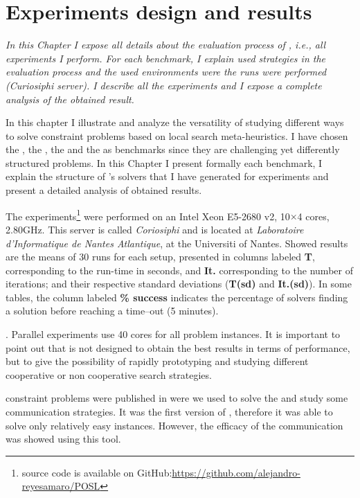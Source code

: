 \chapter{Experiments design and results}
\label{chap:expe}
\textit{In this Chapter I expose all details about the evaluation process of \posl{}, i.e., all experiments I perform. For each benchmark, I explain used strategies in the evaluation process and the used environments were the runs were performed (\textit{Curiosiphi} server). %
I describe all the experiments and I expose a complete analysis of the obtained result.}
\vfill
\minitoc
\newpage

In this chapter I illustrate and analyze the versatility of \posl{} studying different ways to solve constraint problems based on local search meta-heuristics. 
I have chosen the \sgp, the \nqp, the \carrp{} and the \grp{} as benchmarks since they are challenging yet differently structured problems. In this Chapter I present formally each benchmark, I explain the structure of \posl's solvers that I have generated for experiments and present a detailed analysis of obtained results.

The experiments\footnote{\posl{} source code is available on GitHub:\href{https://github.com/alejandro-reyesamaro/POSL}{https://github.com/alejandro-reyesamaro/POSL}} 
were performed on an Intel\R{} Xeon\TM{} E5-2680 v2, 10$\times$4 cores, 2.80GHz. This server is called \textit{Coriosiphi} and is located at \textit{Laboratoire d'Informatique de Nantes Atlantique}, at the Universiti of Nantes. Showed results are the means of 30 runs for each setup, presented in columns labeled {\bf T}, corresponding to the run-time in seconds, and {\bf It.} corresponding to the number of iterations; and their respective standard deviations ({\bf T(sd)} and {\bf It.(sd)}). In some tables, the column labeled \textbf{\% success} indicates the percentage of solvers finding a solution before reaching a time--out (5 minutes).

. Parallel experiments use 40 cores for all problem instances. It is important to point out that \posl{} is not designed to obtain the best results in terms of performance, but to give the possibility of rapidly prototyping and studying different cooperative or non cooperative search strategies.


 constraint problems were published in \cite{Reyes-amaro} were we used \posl{} to solve the \sgp{} and study some communication strategies. It was the first version of \posl{}, therefore it was able to solve only relatively easy instances. However, the efficacy of the communication was showed using this tool.

